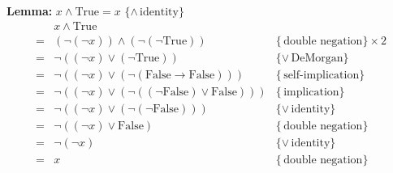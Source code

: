 \documentclass[fleqn]{article}
\newenvironment{proof}
  {\[\begin{array}{lll}}
  {\end{array}\]}
\newcommand{\law}[2][\!]{\{{#1\,}\mbox{{#2}}\}}
\newcommand{\True}[0]{\mathrm{True}}
\newcommand{\False}[0]{\mathrm{False}}
\begin{document}
\begin{enumerate}
      \textbf{Lemma:} $ x \wedge \True = x $  $ \law[\wedge]{identity} $
      \begin{proof}
          & x \wedge \True & \\
        = & (\neg (\neg x)) \wedge (\neg (\neg \True)) & \law{double negation} \times 2 \\
        = & \neg ((\neg x) \vee (\neg \True)) & \law[\vee]{DeMorgan} \\
        = & \neg ((\neg x) \vee (\neg (\False \rightarrow \False))) & \law{self-implication} \\
        = & \neg ((\neg x) \vee (\neg ((\neg \False) \vee \False))) & \law{implication} \\
        = & \neg ((\neg x) \vee (\neg (\neg \False))) & \law[\vee]{identity} \\
        = & \neg ((\neg x) \vee \False) & \law{double negation} \\
        = & \neg (\neg x) & \law[\vee]{identity} \\
        = & x & \law{double negation} \\
      \end{proof}


\end{enumerate}
\end{document}
